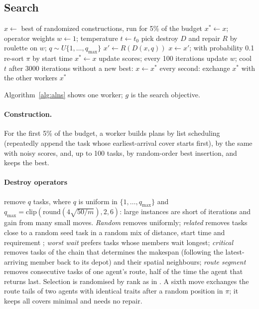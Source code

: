 \subsection{Search}
\label{sec:search}

\begin{algorithm}[t]
\caption{ALNS worker (one process)}
\label{alg:alns}
\begin{algorithmic}[1]
\STATE $x \gets$ best of randomized constructions, run for 5\% of the budget
\STATE $x^* \gets x$; operator weights $w \gets 1$; temperature $t \gets t_0$
  \STATE pick destroy $D$ and repair $R$ by roulette on $w$; $q \sim U\{1, \dots, q_{\max}\}$
  \STATE $x' \gets R(D(x, q))$ 
    \STATE $x \gets x'$; with probability 0.1 re-sort $\pi$ by start time
     \STATE $x^* \gets x$ \ENDIF
  \ENDIF
  \STATE update scores; every 100 iterations update $w$; cool $t$
  \STATE after 3000 iterations without a new best: $x \gets x^*$
  \STATE every second: exchange $x^*$ with the other workers
\ENDWHILE
\RETURN $x^*$
\end{algorithmic}
\end{algorithm}

Algorithm~\ref{alg:alns} shows one worker; $g$ is the search objective.

\paragraph{Construction.} For the first 5\% of the budget, a worker builds plans by list scheduling
\cite{kolisch1996serial} (repeatedly append the task whose earliest-arrival cover starts first), by the same with noisy scores, and, up to 100 tasks, by
random-order best insertion, and keeps the best.

\paragraph{Destroy operators} remove $q$ tasks, where $q$ is uniform in $\{1, \dots, q_{\max}\}$ and
$q_{\max} = \mathrm{clip}(\mathrm{round}(4\sqrt{50/m}), 2, 6)$: large instances are short of iterations and gain from
many small moves. \emph{Random} removes uniformly; \emph{related} removes tasks close to a random seed task in a random
mix of distance, start time and requirement \cite{shaw1998using}; \emph{worst wait} prefers tasks whose members wait
longest; \emph{critical} removes tasks of the chain that determines the makespan (following the latest-arriving member
back to its depot) and their spatial neighbours; \emph{route segment} removes consecutive tasks of one agent's route,
half of the time the agent that returns last. Selection is randomised by rank as in \citet{ropke2006adaptive}. A sixth
move exchanges the route tails of two agents with identical traits after a random position in $\pi$; it keeps all
covers minimal and needs no repair.


